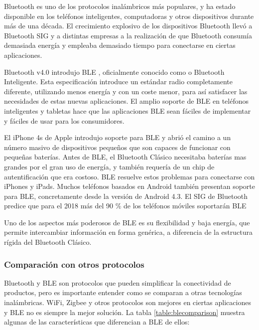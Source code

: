 Bluetooth es uno de los protocolos inalámbricos más populares, y ha estado disponible en los teléfonos inteligentes, computadoras y otros dispositivos durante más de una década. El crecimiento explosivo de los dispositivos Bluetooth llevó a Bluetooth \ac{SIG} y a distintas empresas a la realización de que Bluetooth consumía demasiada energía y empleaba demasiado tiempo para conectarse en ciertas aplicaciones.

Bluetooth v4.0 introdujo \ac{BLE} , oficialmente conocido como  o Bluetooth Inteligente. Esta especificación introduce un estándar radio completamente diferente, utilizando menos energía y con un coste menor, para así satisfacer las necesidades de estas nuevas aplicaciones. El amplio soporte de \ac{BLE} en teléfonos inteligentes y tabletas hace que las aplicaciones BLE sean fáciles de implementar y fáciles de usar para los consumidores.

El iPhone 4s de Apple introdujo soporte para \ac{BLE} y abrió el camino a un número masivo de dispositivos pequeños que son capaces de funcionar con pequeñas baterías. Antes de \ac{BLE}, el Bluetooth Clásico necesitaba baterías mas grandes por el gran uso de energía, y también requería de un chip de autentificación que era costoso. \ac{BLE} resuelve estos problemas para conectarse con iPhones y iPads. Muchos teléfonos basados en Android también presentan soporte para \ac{BLE}, concretamente desde la versión de Android 4.3. El \ac{SIG} de Bluetooth predice que para el 2018 más del 90 \% de los teléfonos móviles soportarán \ac{BLE}

Uno de los aspectos más poderosos de BLE es su flexibilidad y baja energía, que permite intercambiar información en forma genérica, a diferencia de la estructura rígida del Bluetooth Clásico.

\subsubsection{Comparación con otros protocolos}

Bluetooth y \ac{BLE} son protocolos que pueden simplificar la conectividad de productos, pero es importante entender como se comparan a otras tecnologías inalámbricas. WiFi, Zigbee y otros protocolos son mejores en ciertas aplicaciones  y \ac{BLE} no es siempre la mejor solución. La tabla \ref{table:blecomparison} muestra algunas de las características que diferencian a \ac{BLE} de ellos:


